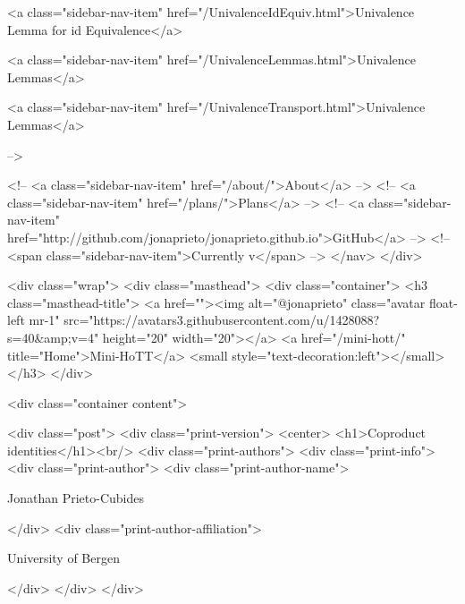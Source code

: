       
    
      
        
          <a class="sidebar-nav-item" href="/UnivalenceIdEquiv.html">Univalence Lemma for id Equivalence</a>
        
      
    
      
        
          <a class="sidebar-nav-item" href="/UnivalenceLemmas.html">Univalence Lemmas</a>
        
      
    
      
        
          <a class="sidebar-nav-item" href="/UnivalenceTransport.html">Univalence Lemmas</a>
        
      
     -->

    <!-- <a class="sidebar-nav-item" href="/about/">About</a> -->
    <!-- <a class="sidebar-nav-item" href="/plans/">Plans</a> -->
    <!-- <a class="sidebar-nav-item" href="http://github.com/jonaprieto/jonaprieto.github.io">GitHub</a> -->
    <!-- <span class="sidebar-nav-item">Currently v</span> -->
  </nav>
</div>

    <div class="wrap">
      <div class="masthead">
        <div class="container">
          <h3 class="masthead-title">
            <a href=""><img alt="@jonaprieto" class="avatar float-left mr-1" src="https://avatars3.githubusercontent.com/u/1428088?s=40&amp;v=4" height="20" width="20"></a>
            <a href="/mini-hott/" title="Home">Mini-HoTT</a>
            <small style="text-decoration:left"></small>
          </h3>
        </div>
      
      <div class="container content">
        







<div class="post">
  <div class="print-version">
    <center>
      <h1>Coproduct identities</h1><br/>
        <div class="print-authors">
          <div class="print-info">
            <div class="print-author">
              <div class="print-author-name">
                
                  Jonathan Prieto-Cubides
                
              </div>
              <div class="print-author-affiliation">
                
                  University of Bergen
                
                </div>
            </div>
          </div>
          
